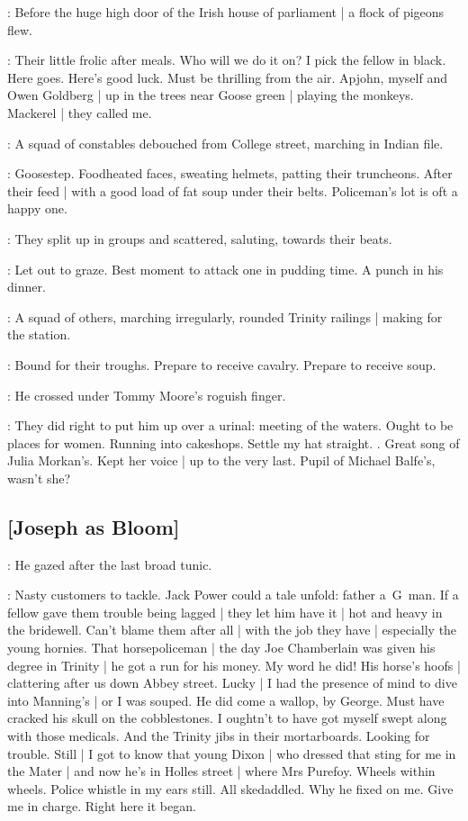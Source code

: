 :
Before the huge high door of the Irish house of parliament |
a flock of pigeons flew.

\BloomInt:
Their little frolic after meals.
Who will we do it on?
I pick the fellow in black.
Here goes.
Here's good luck.
Must be thrilling from the air.
Apjohn, myself and Owen Goldberg |
up in the trees near Goose green |
playing the monkeys.
Mackerel |
they called me.

:
A squad of constables debouched from College street,
marching in Indian file.

\BloomInt:
Goosestep.
Foodheated faces,
sweating helmets,
patting their truncheons.
After their feed |
with a good load of fat soup under their belts.
Policeman's lot is oft a happy one.

:
They split up in groups and scattered,
saluting,
towards their beats.

\BloomInt:
Let out to graze.
Best moment to attack one in pudding time.
A punch in his dinner.

:
A squad of others,
marching irregularly,
rounded Trinity railings |
making for the station.

\BloomInt:
Bound for their troughs.
Prepare to receive cavalry.
Prepare to receive soup.

:
He crossed under Tommy Moore's roguish finger.

\BloomInt:
They did right to put him up over a urinal:
meeting of the waters.
Ought to be places for women.
Running into cakeshops.
Settle my hat straight.
.
Great song of Julia Morkan's.
Kept her voice |
up to the very last.
Pupil of Michael Balfe's,
wasn't she?

\subsection{[Joseph as Bloom]}

:
He gazed after the last broad tunic.

\BloomInt:
Nasty customers to tackle.
Jack Power could a tale unfold:
father a~G~man.
If a fellow gave them trouble being lagged |
they let him have it |
hot and heavy in the bridewell.
Can't blame them after all |
with the job they have |
especially the young hornies.
That horsepoliceman |
the day Joe Chamberlain was given his degree in Trinity |
he got a run for his money.
My word he did!
His horse's hoofs |
clattering after us down Abbey street.
Lucky |
I had the presence of mind to dive into Manning's |
or I was souped.
He did come a wallop,
by George.
Must have cracked his skull on the cobblestones.
I oughtn't to have got myself swept along with those medicals.
And the Trinity jibs in their mortarboards.
Looking for trouble.
Still |
I got to know that young Dixon |
who dressed that sting for me in the Mater |
and now he's in Holles street |
where Mrs Purefoy.
Wheels within wheels.
Police whistle in my ears still.
All skedaddled.
Why he fixed on me.
Give me in charge.
Right here it began.

